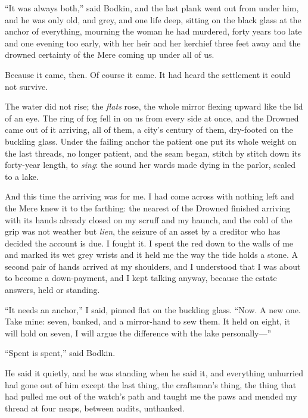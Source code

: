 ``It was always both,'' said Bodkin, and the last plank went out from under him, and he was only old, and grey, and one life deep, sitting on the black glass at the anchor of everything, mourning the woman he had murdered, forty years too late and one evening too early, with her heir and her kerchief three feet away and the drowned certainty of the Mere coming up under all of us.

Because it came, then. Of course it came. It had heard the settlement it could not survive.

\scenebreak

The water did not rise; the \emph{flats} rose, the whole mirror flexing upward like the lid of an eye. The ring of fog fell in on us from every side at once, and the Drowned came out of it arriving, all of them, a city's century of them, dry-footed on the buckling glass. Under the failing anchor the patient one put its whole weight on the last threads, no longer patient, and the seam began, stitch by stitch down its forty-year length, to \emph{sing}: the sound her wards made dying in the parlor, scaled to a lake.

And this time the arriving was for me. I had come across with nothing left and the Mere knew it to the farthing: the nearest of the Drowned finished arriving with its hands already closed on my scruff and my haunch, and the cold of the grip was not weather but \emph{lien}, the seizure of an asset by a creditor who has decided the account is due. I fought it. I spent the red down to the walls of me and marked its wet grey wrists and it held me the way the tide holds a stone. A second pair of hands arrived at my shoulders, and I understood that I was about to become a down-payment, and I kept talking anyway, because the estate answers, held or standing.

``It needs an anchor,'' I said, pinned flat on the buckling glass. ``Now. A new one. Take mine: seven, banked, and a mirror-hand to sew them. It held on eight, it will hold on seven, I will argue the difference with the lake personally---''

``Spent is spent,'' said Bodkin.

He said it quietly, and he was standing when he said it, and everything unhurried had gone out of him except the last thing, the craftsman's thing, the thing that had pulled me out of the watch's path and taught me the paws and mended my thread at four neaps, between audits, unthanked.

